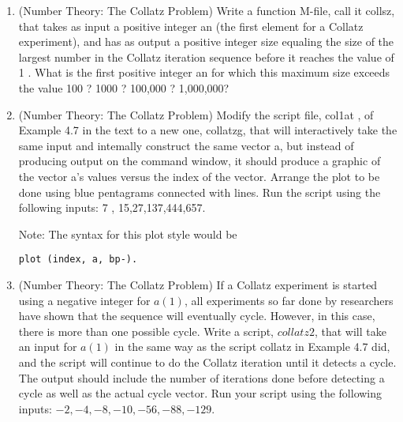 \documentclass[../main.tex]{subfiles}
\begin{document}
\begin{enumerate}
(b) Number a set of cards from 1 to 20, and shuffle them. Tum the cards over one by one and record the number of times $K$ that card number i $(1 \leq i \leq 20)$ occurs at (exactly) the $i$ th draw. Estimate the expected value of $K$.

Note: Simulation is a very useful tool for obtaining estimates for quantities that can be impossible to estimate analytically; see [Ros-02] for a well-written introduction to this interesting subject. In it the reader can also find a rigorous definition of the expectation of a random variable associated with a (random) experiment. The quantities $K$ and $N$ above are examples of random variables. Their outcomes are numerical quantities associated with the outcomes of (random) experiments. Although the outcomes of random variables are somewhat unpredictable, their long-term averages do exhibit patterns that can be nicely characterized.

For the above two problems, the exact expectations are obtainable using methods of probability; they are $N=e$ and $K=1$.

The next four exercises will revisit the Collatz conjecture that was introduced in the preceding section.

\item (Number Theory: The Collatz Problem) Write a function M-file, call it collsz, that takes as input a positive integer an (the first element for a Collatz experiment), and has as output a positive integer size equaling the size of the largest number in the Collatz iteration sequence before it reaches the value of 1 . What is the first positive integer an for which this maximum size exceeds the value 100 ? 1000 ? 100,000 ? 1,000,000?

  \item (Number Theory: The Collatz Problem) Modify the script file, col1at , of Example 4.7 in the text to a new one, collatzg, that will interactively take the same input and intemally construct the same vector a, but instead of producing output on the command window, it should produce a graphic of the vector a's values versus the index of the vector. Arrange the plot to be done using blue pentagrams connected with lines. Run the script using the following inputs: 7 , 15,27,137,444,657.

Note: The syntax for this plot style would be \begin{verbatim}plot (index, a, bp-).\end{verbatim}

\item (Number Theory: The Collatz Problem) If a Collatz experiment is started using a negative integer for $a(1)$, all experiments so far done by researchers have shown that the sequence will eventually cycle. However, in this case, there is more than one possible cycle. Write a script, $collatz2$, that will take an input for $a(1)$ in the same way as the script collatz in Example 4.7 did, and the script will continue to do the Collatz iteration until it detects a cycle. The output should include the number of iterations done before detecting a cycle as well as the actual cycle vector. Run your script using the following inputs: $-2,-4,-8,-10,-56,-88, -129$.


\end{enumerate}
\end{document}

